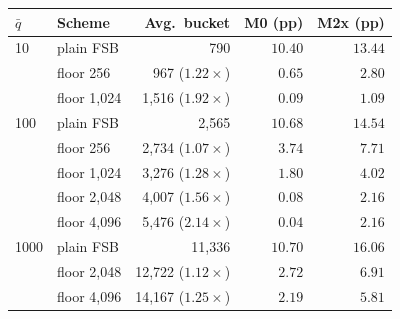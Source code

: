 \begin{tabular}{llrrr}
\toprule
$\bar q$ & Scheme & Avg.\ bucket & M0 (pp) & M2x (pp) \\
\midrule
10 & plain FSB & 790 & $10.40$ & $13.44$ \\
 & floor 256 & 967 ($1.22\times$) & $0.65$ & $2.80$ \\
 & floor 1,024 & 1,516 ($1.92\times$) & $0.09$ & $1.09$ \\
\midrule
100 & plain FSB & 2,565 & $10.68$ & $14.54$ \\
 & floor 256 & 2,734 ($1.07\times$) & $3.74$ & $7.71$ \\
 & floor 1,024 & 3,276 ($1.28\times$) & $1.80$ & $4.02$ \\
 & floor 2,048 & 4,007 ($1.56\times$) & $0.08$ & $2.16$ \\
 & floor 4,096 & 5,476 ($2.14\times$) & $0.04$ & $2.16$ \\
\midrule
1000 & plain FSB & 11,336 & $10.70$ & $16.06$ \\
 & floor 2,048 & 12,722 ($1.12\times$) & $2.72$ & $6.91$ \\
 & floor 4,096 & 14,167 ($1.25\times$) & $2.19$ & $5.81$ \\
\bottomrule
\end{tabular}
